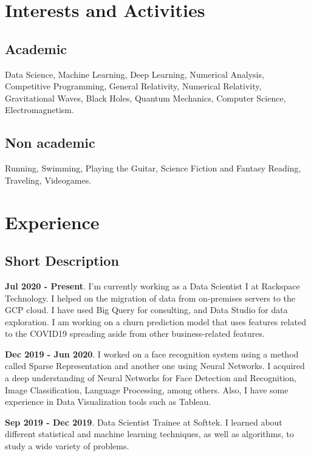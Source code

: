 \documentclass[a4paper,10pt]{article} %
\begin{document}
\section{Interests and Activities}
\bigskip
\subsection*{Academic}
Data Science, Machine Learning, Deep Learning, Numerical Analysis, Competitive Programming, General Relativity, Numerical Relativity, Gravitational Waves, Black Holes, Quantum Mechanics, Computer Science, Electromagnetism.
\subsection*{Non academic}
Running, Swimming, Playing the Guitar, Science Fiction and Fantasy Reading, Traveling, Videogames. 
\bigskip

\section{Experience}
\bigskip

\subsection{Short Description}
\vspace{0.2cm}
\textbf{Jul 2020 - Present}. I'm currently working as a Data Scientist I at Rackspace Technology. I helped on the migration of data from on-premises servers to the GCP cloud. I have used Big Query for consulting, and Data Studio for data exploration. I am working on a churn prediction model that uses features related to the COVID19 spreading aside from other business-related features.

\textbf{Dec 2019 - Jun 2020}. I worked on a face recognition system using a method called Sparse Representation and another one using Neural Networks. I acquired a deep understanding of Neural Networks for Face Detection and Recognition, Image Classification, Language Processing, among others. Also, I have some experience in Data Visualization tools such as Tableau.

\textbf{Sep 2019 - Dec 2019}. Data Scientist Trainee at Softtek. I learned about different statistical and machine learning techniques, as well as algorithms, to study a wide variety of problems.
\end{document}
